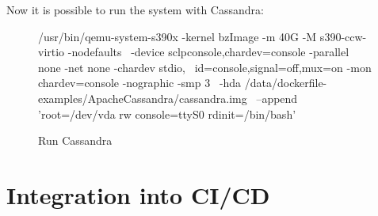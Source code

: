 Now it is possible to run the system with Cassandra: \\
\begin{figure}[H]
\centering
\begin{boxedverbatim}
 /usr/bin/qemu-system-s390x -kernel bzImage -m 40G -M s390-ccw-virtio -nodefaults \
 -device sclpconsole,chardev=console -parallel none -net none -chardev stdio, \
 id=console,signal=off,mux=on -mon chardev=console -nographic -smp 3 \
 -hda /data/dockerfile-examples/ApacheCassandra/cassandra.img \
 --append 'root=/dev/vda rw console=ttyS0 rdinit=/bin/bash' 
\end{boxedverbatim}
 \caption{Run Cassandra}
    \label{RunCassandra}
\end{figure}

\newpage
\section{Integration into CI/CD}


